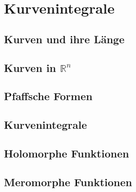 \chapter{Kurvenintegrale}
\section{Kurven und ihre Länge}
\section{Kurven in $\mathbb R^n$}
\section{Pfaffsche Formen}
\section{Kurvenintegrale}
\section{Holomorphe Funktionen}
\section{Meromorphe Funktionen}
